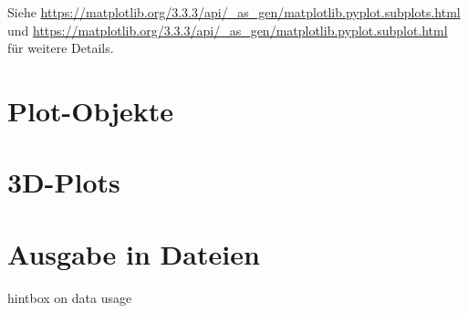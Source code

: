 Siehe \url{https://matplotlib.org/3.3.3/api/_as_gen/matplotlib.pyplot.subplots.html} und \url{https://matplotlib.org/3.3.3/api/_as_gen/matplotlib.pyplot.subplot.html} für weitere Details.

\section{Plot-Objekte}


\section{3D-Plots}


\section{Ausgabe in Dateien}
hintbox on data usage

